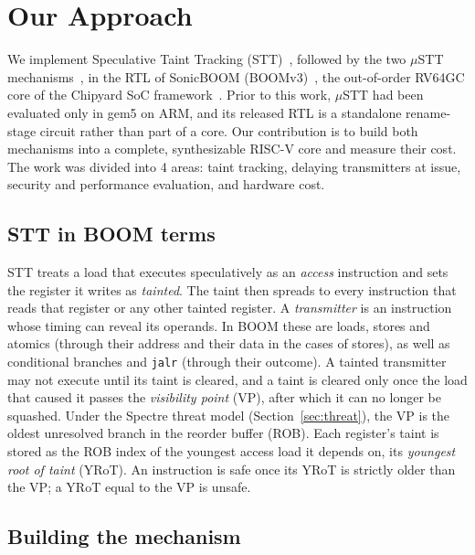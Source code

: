 \section{Our Approach}
\label{sec:approach}


We implement Speculative Taint Tracking (STT)~\cite{Yu:STT:2019}, followed by
the two $\mu$STT mechanisms~\cite{Chen:uSTT:2025}, in the RTL of SonicBOOM
(BOOMv3)~\cite{Zhao:SonicBOOM:2020}, the out-of-order RV64GC core of the
Chipyard SoC framework~\cite{Amid:Chipyard:2020}. Prior to this work, $\mu$STT had
been evaluated only in gem5 on ARM, and its released RTL is a standalone
rename-stage circuit rather than part of a core. Our contribution is to build
both mechanisms into a complete, synthesizable RISC-V core and measure their
cost. The work was divided into 4 areas: taint tracking, delaying
transmitters at issue, security and performance evaluation, and
hardware cost.

\subsection{STT in BOOM terms}
STT treats a load that executes speculatively as an \emph{access}
instruction and sets the register it writes as \emph{tainted}. The taint then spreads
to every instruction that reads that register or any other tainted register.
A \emph{transmitter} is an instruction whose timing can reveal its operands.
In BOOM these are loads, stores and atomics (through their address and their data in the 
cases of stores), as well as conditional branches and \texttt{jalr} (through their
outcome). A tainted transmitter may not execute until its taint is cleared,
and a taint is cleared only once the load that caused it passes the
\emph{visibility point} (VP), after which it can no longer be squashed. Under
the Spectre threat model (Section~\ref{sec:threat}), the VP is the oldest
unresolved branch in the reorder buffer (ROB). Each register's taint is stored
as the ROB index of the youngest access load it depends on, its
\emph{youngest root of taint} (YRoT). An instruction is safe once its YRoT is
strictly older than the VP; a YRoT equal to the VP is unsafe.

\subsection{Building the mechanism}

